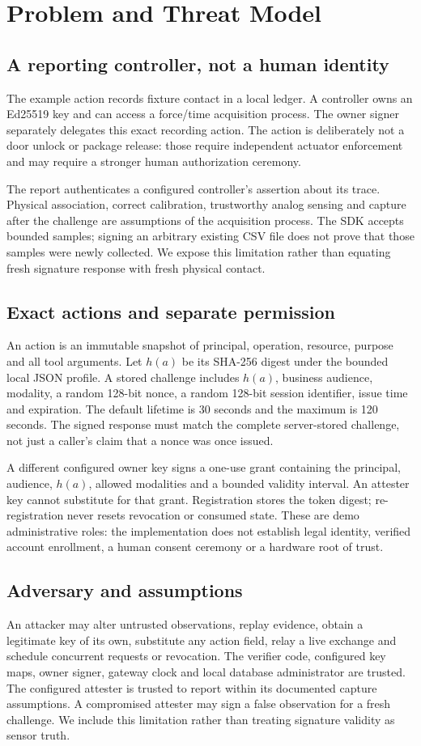 \section{Problem and Threat Model}
\subsection{A reporting controller, not a human identity}
The example action records fixture contact in a local ledger. A controller owns
an Ed25519 key and can access a force/time acquisition process. The owner signer
separately delegates this exact recording action. The action is deliberately not
a door unlock or package release: those require independent actuator enforcement
and may require a stronger human authorization ceremony.

The report authenticates a configured controller's assertion about its trace.
Physical association, correct calibration, trustworthy analog sensing and capture
after the challenge are assumptions of the acquisition process. The SDK accepts
bounded samples; signing an arbitrary existing CSV file does not prove that those
samples were newly collected. We expose this limitation rather than equating
fresh signature response with fresh physical contact.
\subsection{Exact actions and separate permission}
An action is an immutable snapshot of principal, operation, resource, purpose and
all tool arguments. Let $h(a)$ be its SHA-256 digest under the bounded local JSON
profile. A stored challenge includes $h(a)$, business audience, modality, a random
128-bit nonce, a random 128-bit session identifier, issue time and expiration.
The default lifetime is 30 seconds and the maximum is 120 seconds. The signed
response must match the complete server-stored challenge, not just a caller's
claim that a nonce was once issued.

A different configured owner key signs a one-use grant containing the principal,
audience, $h(a)$, allowed modalities and a bounded validity interval. An attester
key cannot substitute for that grant. Registration stores the token digest;
re-registration never resets revocation or consumed state. These are demo
administrative roles: the implementation does not establish legal identity,
verified account enrollment, a human consent ceremony or a hardware root of trust.

\subsection{Adversary and assumptions}
An attacker may alter untrusted observations, replay evidence, obtain a legitimate
key of its own, substitute any action field, relay a live exchange and schedule
concurrent requests or revocation. The verifier code, configured key maps,
owner signer, gateway clock and local database administrator are trusted.
The configured attester is trusted to report within its documented capture
assumptions. A compromised attester may sign a false observation for a fresh
challenge. We include this limitation rather than treating signature validity as
sensor truth.

